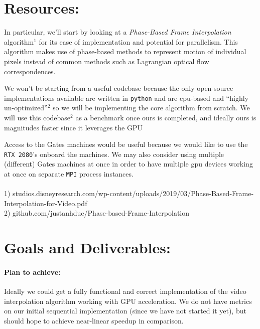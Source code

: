 \documentclass[12pt]{article}
\begin{document}
\section*{Resources:}
\par In particular, we'll start by looking at a \textit{Phase-Based Frame Interpolation} algorithm$^1$ for its ease of implementation and potential for parallelism. This algorithm makes use of phase-based methods to represent motion of individual pixels instead of common methods such as Lagrangian optical flow correspondences.
\par We won't be starting from a useful codebase because the only open-source implementations available are written in \texttt{python} and are cpu-based and ``highly un-optimized''$^2$ so we will be implementing the core algorithm from scratch. We will use this codebase$^2$ as a benchmark once ours is completed, and ideally ours is magnitudes faster since it leverages the GPU
\par Access to the Gates machines would be useful because we would like to use the \texttt{RTX 2080}'s onboard the machines. We may also consider using multiple (different) Gates machines at once in order to have multiple gpu devices working at once on separate \texttt{MPI} process instances. 
$~$\\\\
1) studios.disneyresearch.com/wp-content/uploads/2019/03/Phase-Based-Frame-Interpolation-for-Video.pdf\\
2) github.com/justanhduc/Phase-based-Frame-Interpolation

\section*{Goals and Deliverables:}
\paragraph{Plan to achieve:}
\par Ideally we could get a fully functional and correct implementation of the video interpolation algorithm working with GPU acceleration. We do not have metrics on our initial sequential implementation (since we have not started it yet), but should hope to achieve near-linear speedup in comparison. 
\end{document}
